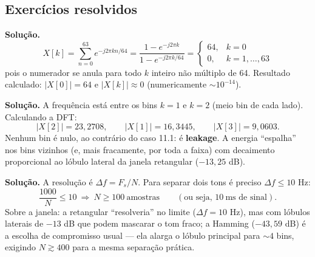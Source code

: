 \subsection*{Exercícios resolvidos}


\textbf{Solução.}
\[
  X[k]=\sum_{n=0}^{63}e^{-j2\pi kn/64}=
  \frac{1-e^{-j2\pi k}}{1-e^{-j2\pi k/64}}
  =
  \begin{cases}64,&k=0\\0,&k=1,\dots,63\end{cases}
\]
pois o numerador se anula para todo $k$ inteiro não múltiplo de 64. Resultado
calculado: $|X[0]|=64$ e $|X[k]|\approx0$ (numericamente $\sim10^{-14}$).



\textbf{Solução.} A frequência está entre os bins $k=1$ e $k=2$ (meio bin de
cada lado). Calculando a DFT:
\[
  |X[2]|=23{,}2708,\qquad |X[1]|=16{,}3445,\qquad |X[3]|=9{,}0603 .
\]
Nenhum bin é nulo, ao contrário do caso 11.1: é \textbf{leakage}. A energia
``espalha'' nos bins vizinhos (e, mais fracamente, por toda a faixa) com
decaimento proporcional ao lóbulo lateral da janela retangular
($-13{,}25$ dB).



\textbf{Solução.} A resolução é $\Delta f=F_s/N$. Para separar dois tons é
preciso $\Delta f\le10$ Hz:
\[
  \frac{1000}{N}\le10\ \Rightarrow\ N\ge100\ \text{amostras}
  \qquad(\text{ou seja, }10\ \text{ms de sinal}).
\]
Sobre a janela: a retangular ``resolveria'' no limite ($\Delta f=10$ Hz), mas
com lóbulos laterais de $-13$ dB que podem mascarar o tom fraco; a Hamming
($-43{,}59$ dB) é a escolha de compromisso usual — ela alarga o lóbulo
principal para $\sim4$ bins, exigindo $N\gtrsim400$ para a mesma separação
prática.

